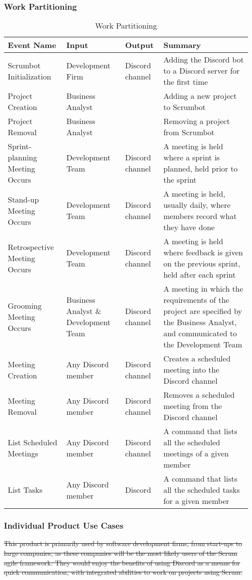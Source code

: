 \documentclass[12pt, titlepage]{article}
\begin{document}
\subsubsection{Work Partitioning}
\begin{longtable}{|L{4cm}|L{3cm}|L{1.5cm}|L{6cm}|}
    \caption{Work Partitioning}
    \label{tab:my_label}\\
    \hline
    Event Name & Input & Output & Summary \\
    \hline
    Scrumbot Initialization & Development Firm & Discord channel & Adding the Discord bot to a Discord server for the first time\\
    \hline
    Project Creation & Business Analyst & & Adding a new project to Scrumbot\\
    \hline
    Project Removal & Business Analyst & & Removing a project from Scrumbot\\
    \hline
    Sprint-planning Meeting Occurs & Development Team & Discord channel & A meeting is held where a sprint is planned, held prior to the sprint\\
    \hline
    Stand-up Meeting Occurs & Development Team & Discord channel & A meeting is held, usually daily, where members record what they have done\\
    \hline
    Retrospective Meeting Occurs & Development Team & Discord channel & A meeting is held where feedback is given on the previous sprint, held after each sprint\\
    \hline
    Grooming Meeting Occurs & Business Analyst \& Development Team & Discord channel & A meeting in which the requirements of the project are specified by the Business Analyst, and communicated to the Development Team\\
    \hline
    Meeting Creation & Any Discord member & Discord channel & Creates a scheduled meeting into the Discord channel\\
    \hline
    Meeting Removal & Any Discord member & Discord channel & Removes a scheduled meeting from the Discord channel\\
    \hline
    List Scheduled Meetings & Any Discord member & Discord channel & A command that lists all the scheduled meetings of a given member\\
    \hline
    List Tasks & Any Discord member & Discord & A command that lists all the scheduled tasks for a given member\\
    \hline
\end{longtable}

\subsubsection{Individual Product Use Cases}
\sout{This product is primarily used by software development firms, from start-ups to large companies, as these companies will be the most likely users of the Scrum agile framework. They would enjoy the benefits of using Discord as a means for quick communication, with integrated abilities to work on projects using Scrum.}\\
\end{document}
